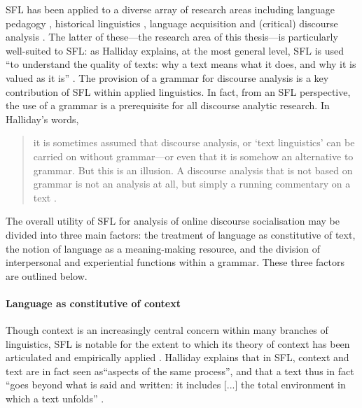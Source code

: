 
	  SFL has been applied to a diverse array of research areas including language pedagogy \cite{halliday_towards_1993}, historical linguistics \cite{martin_re/reading_2003}, language acquisition \cite{hasan_learning_1994} and (critical) discourse analysis \cite{hunston_systemic_2013,le_systematic_2009}. The latter of these---the research area of this thesis---is particularly well-suited to SFL: as Halliday explains, at the most general level, SFL is used ``to understand the quality of texts: why a text means what it does, and why it is valued as it is'' \citeyear[p.~xxx]{halliday_introduction:_2004}. The provision of a grammar for discourse analysis is a key contribution of SFL within applied linguistics. In fact, from an SFL perspective, the use of a grammar is a prerequisite for all discourse analytic research. In Halliday's words,

	  \begin{quote}\small\singlespacing
	  it is sometimes assumed that discourse analysis, or `text linguistics' can be carried on without grammar---or even that it is somehow an alternative to grammar. But this is an illusion. A discourse analysis that is not based on grammar is not an analysis at all, but simply a running commentary on a text \citeyear[p.~xvii]{halliday_introduction:_2004}.
	  \end{quote}

	  The overall utility of SFL for analysis of online discourse socialisation may be divided into three main factors: the treatment of language as constitutive of text, the notion of language as a meaning-making resource, and the division of interpersonal and experiential functions within a grammar. These three factors are outlined below.

		 \paragraph{Language as constitutive of context}
		 
			Though context is an increasingly central concern within many branches of linguistics, SFL is notable for the extent to which its theory of context has been articulated and empirically applied \cite{widdowson_text_2008}. Halliday explains that in SFL, context and text are in fact seen as``aspects of the same process'', and that a text thus in fact ``goes beyond what is said and written: it includes [...] the total environment in which a text unfolds'' \textcite[p.~5]{halliday_language_1989}.

